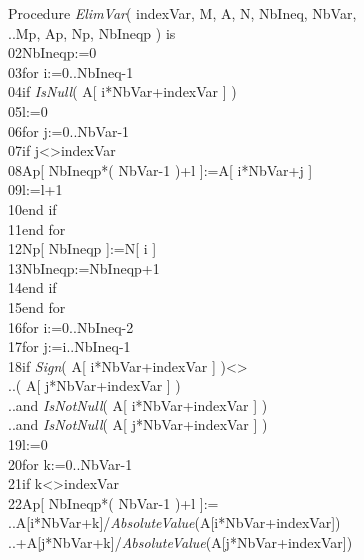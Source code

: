 \documentclass[12pt, a4paper]{article}
\begin{document}
\begin{ttfamily}
\quad Procedure {\em ElimVar}( indexVar, M, A, N, NbIneq, NbVar, \\
..\quad\quad Mp, Ap, Np, NbIneqp ) is\\
02\quad\quad NbIneqp:=0\\
03\quad\quad for i:=0..NbIneq-1\\
04\quad\quad\quad if {\em IsNull}( A[ i*NbVar+indexVar ] )\\
05\quad\quad\quad\quad l:=0\\
06\quad\quad\quad\quad for j:=0..NbVar-1\\
07\quad\quad\quad\quad\quad if j<>indexVar\\
08\quad\quad\quad\quad\quad\quad Ap[ NbIneqp*( NbVar-1 )+l ]:=A[ i*NbVar+j ]\\
09\quad\quad\quad\quad\quad\quad l:=l+1\\
10\quad\quad\quad\quad\quad end if\\
11\quad\quad\quad\quad end for\\
12\quad\quad\quad\quad Np[ NbIneqp ]:=N[ i ]\\
13\quad\quad\quad\quad NbIneqp:=NbIneqp+1\\
14\quad\quad\quad end if\\
15\quad\quad end for\\
16\quad\quad for i:=0..NbIneq-2\\
17\quad\quad\quad for j:=i..NbIneq-1\\
18\quad\quad\quad\quad if {\em Sign}( A[ i*NbVar+indexVar ] )<>\\
..\quad\quad\quad\quad{}( A[ j*NbVar+indexVar ] ) \\
..\quad\quad\quad\quad\quad and {\em IsNotNull}( A[ i*NbVar+indexVar ] ) \\
..\quad\quad\quad\quad\quad and {\em IsNotNull}( A[ j*NbVar+indexVar ] )\\
19\quad\quad\quad\quad\quad l:=0\\
20\quad\quad\quad\quad\quad for k:=0..NbVar-1\\
21\quad\quad\quad\quad\quad\quad if k<>indexVar\\
22\quad\quad\quad\quad\quad\quad\quad Ap[ NbIneqp*( NbVar-1 )+l ]:=\\
..\quad\quad\quad\quad\quad\quad\quad\quad A[i*NbVar+k]/{\em AbsoluteValue}(A[i*NbVar+indexVar])\\
..\quad\quad\quad\quad\quad\quad\quad\quad +A[j*NbVar+k]/{\em AbsoluteValue}(A[j*NbVar+indexVar])\\

\end{ttfamily}
\end{document}
